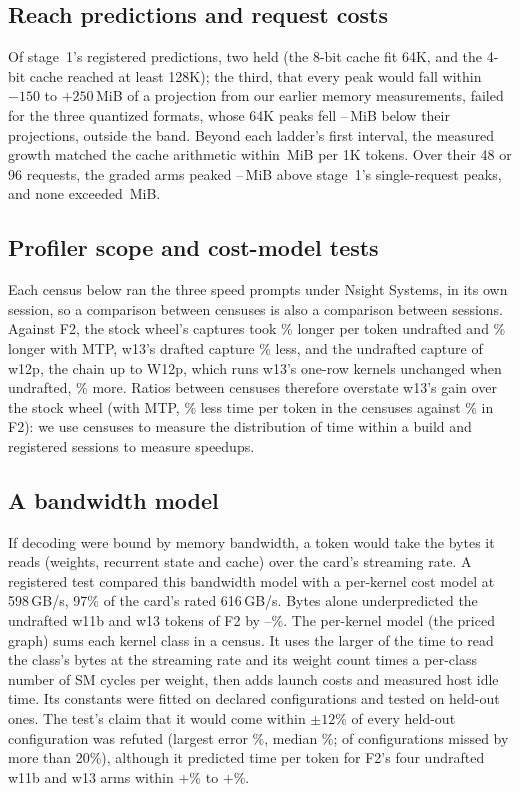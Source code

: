 \documentclass[11pt,letterpaper]{article}
\begin{document}
\subsection{Reach predictions and request costs}
Of stage~1's registered predictions, two
held (the 8-bit cache fit 64K, and the 4-bit cache reached at least 128K); the
third, that every peak would fall within $-150$ to $+250$\,MiB of a projection
from our earlier memory measurements, failed for the three quantized formats,
whose 64K peaks fell \PePOneMin--\PePOneMax\,MiB below their projections,
outside the band.
Beyond each ladder's first interval, the measured growth matched the cache
arithmetic within \PeSlopeDev\,MiB per 1K tokens. Over their 48 or 96
requests, the graded arms peaked \PeRiseMin--\PeRiseMax\,MiB above stage~1's
single-request peaks, and none exceeded \PeArmPeakMax\,MiB.


\subsection{Profiler scope and cost-model tests}
\label{app:cost-model}
Each census below ran the three speed prompts under Nsight
Systems, in its own session, so a comparison between censuses is also a
comparison between sessions. Against F2, the stock wheel's captures took
\PeProfStockPct\% longer per token undrafted and \PeProfStockMtpPct\% longer
with MTP, w13's drafted capture \PeProfWMtpPct\% less, and the undrafted
capture of w12p, the chain up to W12p, which runs w13's one-row kernels
unchanged when undrafted, \PeProfFinPct\% more. Ratios between censuses therefore overstate w13's
gain over the stock wheel (with MTP, \PeCgMsCut\% less time per token in the
censuses against \PeFtMtpCutPct\% in F2): we use censuses to
measure the distribution of time within a build and registered sessions to
measure speedups.

\subsection{A bandwidth model}
\label{sec:bytes}
If decoding were bound by memory bandwidth, a token would take the bytes it
reads (weights, recurrent state and cache) over the card's streaming rate. A
registered test compared this bandwidth model with a per-kernel cost model
at 598\,GB/s, 97\% of the card's rated 616\,GB/s. Bytes alone
underpredicted the undrafted w11b and w13 tokens of F2 by
\PeBytesErrMin--\PeBytesErrMax\%. The per-kernel model (the priced graph) sums each kernel class in a census.
It uses the larger of the time to read the class's bytes at the streaming rate
and its weight count times a per-class number of SM cycles per weight, then
adds launch costs and measured host idle time. Its constants were fitted on
declared configurations and tested on held-out ones. The test's claim that it would
come within $\pm12\%$ of every held-out
configuration was refuted (largest error \PeTTwoMaxErr\%, median
\PeTTwoMedErr\%; \PeTTwoKillN{} of \PeTTwoKillOf{} configurations missed by more
than 20\%), although it predicted time per token for F2's four undrafted w11b and w13 arms within
$+$\PePricedMin\% to $+$\PePricedMax\%.
\end{document}
